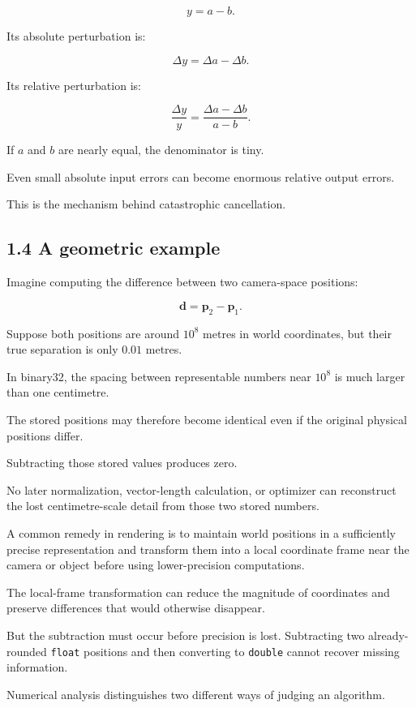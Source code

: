 \[ y=a-b. \]

Its absolute perturbation is:

\[ \Delta y=\Delta a-\Delta b. \]

Its relative perturbation is:

\[ \boxed{ \frac{\Delta y}{y} = \frac{\Delta a-\Delta b}{a-b} }. \]

If \(a\) and \(b\) are nearly equal, the denominator is tiny.

Even small absolute input errors can become enormous relative output errors.

This is the mechanism behind catastrophic cancellation.

\subsection{1.4 A geometric example}\label{02-foundations-ii-ch028-a-geometric-example}

Imagine computing the difference between two camera-space positions:

\[ \mathbf d=\mathbf p_2-\mathbf p_1. \]

Suppose both positions are around \(10^8\) metres in world coordinates, but their true separation is only \(0.01\) metres.

In binary32, the spacing between representable numbers near \(10^8\) is much larger than one centimetre.

The stored positions may therefore become identical even if the original physical positions differ.

Subtracting those stored values produces zero.

No later normalization, vector-length calculation, or optimizer can reconstruct the lost centimetre-scale detail from those two stored numbers.

A common remedy in rendering is to maintain world positions in a sufficiently precise representation and transform them into a local coordinate frame near the camera or object before using lower-precision computations.

The local-frame transformation can reduce the magnitude of coordinates and preserve differences that would otherwise disappear.

But the subtraction must occur before precision is lost. Subtracting two already-rounded \texttt{float} positions and then converting to \texttt{double} cannot recover missing information.

Numerical analysis distinguishes two different ways of judging an algorithm.

